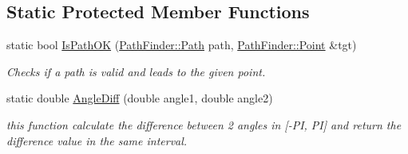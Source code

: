 \subsection*{Static Protected Member Functions}
\begin{DoxyCompactItemize}
\item 
static bool \hyperlink{classTeamRobot_afb5f9191ca185053af37c1ae1f8dcb17}{IsPathOK} (\hyperlink{classPathFinder_a269aba09b7b3208092f67f2bc02cf63e}{PathFinder::Path} path, \hyperlink{structPathFinder_1_1Point}{PathFinder::Point} \&tgt)
\begin{DoxyCompactList}\small\item\em Checks if a path is valid and leads to the given point. \item\end{DoxyCompactList}\item 
static double \hyperlink{classTeamRobot_a45d5d631b1e1e28c9c0f4ecbd47fdbde}{AngleDiff} (double angle1, double angle2)
\begin{DoxyCompactList}\small\item\em this function calculate the difference between 2 angles in \mbox{[}-\/PI, PI\mbox{]} and return the difference value in the same interval. \item\end{DoxyCompactList}\end{DoxyCompactItemize}
